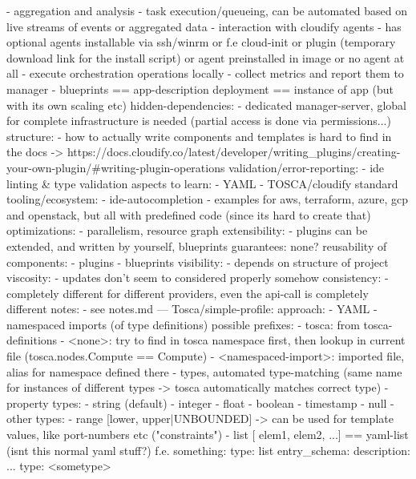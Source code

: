        - aggregation and analysis
        - task execution/queueing, can be automated based on live streams of events or aggregated data
        - interaction with cloudify agents
    - has optional agents installable via ssh/winrm or f.e cloud-init or plugin (temporary download link for the install script) or agent preinstalled in image or no agent at all
      - execute orchestration operations locally
      - collect metrics and report them to manager
    - blueprints == app-description
      deployment == instance of app (but with its own scaling etc)
  hidden-dependencies:
    - dedicated manager-server, global for complete infrastructure is needed (partial access is done via permissions...)
  structure:
    - how to actually write components and templates is hard to find in the docs -> https://docs.cloudify.co/latest/developer/writing_plugins/creating-your-own-plugin/#writing-plugin-operations
  validation/error-reporting:
    - ide linting & type validation
  aspects to learn:
    - YAML
    - TOSCA/cloudify standard
  tooling/ecosystem:
    - ide-autocompletion
    - examples for aws, terraform, azure, gcp and openstack, but all with predefined code (since its hard to create that)
  optimizations:
    - parallelism, resource graph
  extensibility:
    - plugins can be extended, and written by yourself, blueprints
  guarantees: none?
  reusability of components:
    - plugins
    - blueprints
  visibility:
    - depends on structure of project
  viscosity:
    - updates don't seem to considered properly somehow
  consistency:
    - completely different for different providers, even the api-call is completely different
  notes:
    - see notes.md
---
Tosca/simple-profile:
  approach:
    - YAML
    - namespaced imports (of type definitions) possible
      prefixes:
      - tosca: from tosca-definitions
      - <none>: try to find in tosca namespace first, then lookup in current file (tosca.nodes.Compute == Compute)
      - <namespaced-import>: imported file, alias for namespace defined there
    - types, automated type-matching (same name for instances of different types -> tosca automatically matches correct type)
    - property types:
      - string (default)
      - integer
      - float
      - boolean
      - timestamp
      - null
    - other types:
      - range [lower, upper|UNBOUNDED] -> can be used for template values, like port-numbers etc ("constraints")
      - list [ elem1, elem2, ...] == yaml-list (isnt this normal yaml stuff?) f.e.
        something:
          type: list
          entry_schema:
            description: ...
            type: <sometype>
